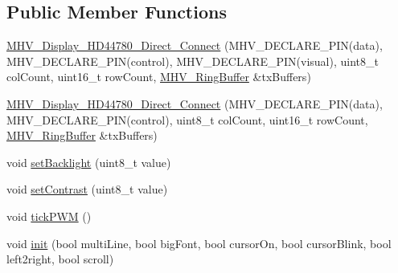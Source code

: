 \subsection*{\-Public \-Member \-Functions}
\begin{DoxyCompactItemize}
\item 
\hyperlink{class_m_h_v___display___h_d44780___direct___connect_aecd4894b4044fde51b75ef609904036f}{\-M\-H\-V\-\_\-\-Display\-\_\-\-H\-D44780\-\_\-\-Direct\-\_\-\-Connect} (\-M\-H\-V\-\_\-\-D\-E\-C\-L\-A\-R\-E\-\_\-\-P\-I\-N(data), \-M\-H\-V\-\_\-\-D\-E\-C\-L\-A\-R\-E\-\_\-\-P\-I\-N(control), \-M\-H\-V\-\_\-\-D\-E\-C\-L\-A\-R\-E\-\_\-\-P\-I\-N(visual), uint8\-\_\-t col\-Count, uint16\-\_\-t row\-Count, \hyperlink{class_m_h_v___ring_buffer}{\-M\-H\-V\-\_\-\-Ring\-Buffer} \&tx\-Buffers)
\item 
\hyperlink{class_m_h_v___display___h_d44780___direct___connect_aea26b842b0f5ed5e8568620354c4021e}{\-M\-H\-V\-\_\-\-Display\-\_\-\-H\-D44780\-\_\-\-Direct\-\_\-\-Connect} (\-M\-H\-V\-\_\-\-D\-E\-C\-L\-A\-R\-E\-\_\-\-P\-I\-N(data), \-M\-H\-V\-\_\-\-D\-E\-C\-L\-A\-R\-E\-\_\-\-P\-I\-N(control), uint8\-\_\-t col\-Count, uint16\-\_\-t row\-Count, \hyperlink{class_m_h_v___ring_buffer}{\-M\-H\-V\-\_\-\-Ring\-Buffer} \&tx\-Buffers)
\item 
void \hyperlink{class_m_h_v___display___h_d44780___direct___connect_a11b8f4c551c0c622874b4242154d9d67}{set\-Backlight} (uint8\-\_\-t value)
\item 
void \hyperlink{class_m_h_v___display___h_d44780___direct___connect_a5d890e072d56c818442b209b9d4851d8}{set\-Contrast} (uint8\-\_\-t value)
\item 
void \hyperlink{class_m_h_v___display___h_d44780___direct___connect_a37c4c7d338ce1a335f18649d302dc6a5}{tick\-P\-W\-M} ()
\item 
void \hyperlink{class_m_h_v___display___h_d44780___direct___connect_a82d09a64c377a8b25751a9b21d9cee93}{init} (bool multi\-Line, bool big\-Font, bool cursor\-On, bool cursor\-Blink, bool left2right, bool scroll)
\end{DoxyCompactItemize}
